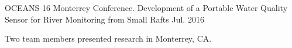 \begin{cventries}
  \cventry
    {OCEANS 16 Monterrey Conference.}
    {Development of a Portable Water Quality Sensor for River Monitoring from Small Rafts}
    {}
    {Jul. 2016}
    {
      \begin{cvitems}
        \item {Two team members presented research in Monterrey, CA.}
      \end{cvitems}
    }
\end{cventries}
